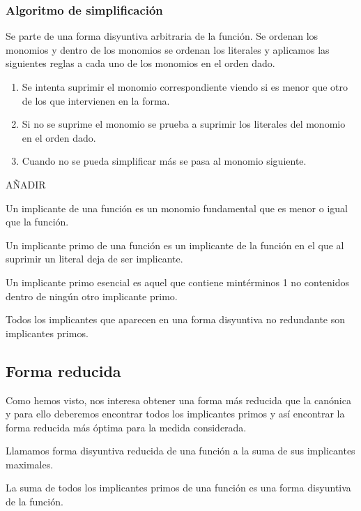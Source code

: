 \subsubsection{Algoritmo de simplificación}
Se parte de una forma disyuntiva arbitraria de la función. Se ordenan los monomios y dentro de los monomios se ordenan los literales y aplicamos las siguientes reglas a cada uno de los monomios en el orden dado.
\begin{enumerate}
    \item Se intenta suprimir el monomio correspondiente viendo si es menor que otro de los que intervienen en la forma.
    \item Si no se suprime el monomio se prueba a suprimir los literales del monomio en el orden dado.
    \item Cuando no se pueda simplificar más se pasa al monomio siguiente.
\end{enumerate}
\begin{ejemplo}
    AÑADIR
\end{ejemplo}

\begin{ndef}[Implicante]
    Un implicante de una función es un monomio fundamental que es menor o igual que la función.
\end{ndef}

\begin{ndef}
    Un implicante primo de una función es un implicante de la función en el que al suprimir un literal deja de ser implicante.
\end{ndef}

\begin{ndef}
    Un implicante primo esencial es aquel que contiene mintérminos 1 no contenidos dentro de ningún otro implicante primo.
\end{ndef}

\begin{nota}
    Todos los implicantes que aparecen en una forma disyuntiva no redundante son implicantes primos.
\end{nota}

\subsection{Forma reducida}
Como hemos visto, nos interesa obtener una forma más reducida que la canónica y para ello deberemos encontrar todos los implicantes primos y así encontrar la forma reducida más óptima para la medida considerada.
\begin{ndef}
    Llamamos forma disyuntiva reducida de una función a la suma de sus implicantes maximales.
\end{ndef}
\begin{nth}
    La suma de todos los implicantes primos de una función es una forma disyuntiva de la función.
\end{nth}

